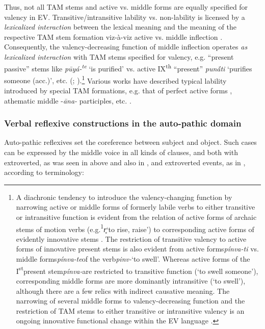 \documentclass[output=paper]{langscibook}
\begin{document}
{Thus, not all TAM stems and active vs. middle forms are equally specified for valency in EV. Transitive/intransitive lability vs. non-lability is licensed by a \textit{lexicalized interaction} between the lexical meaning and the meaning of the respective TAM stem formation viz-à-viz active vs. middle inflection \citep{Pooth2014}. Consequently, the valency-decreasing function of middle inflection operates \textit{as lexicalized interaction} with TAM stems specified for valency, e.g. “present passive” stems like \textit{pūyá-\textsuperscript{te}} ‘is purified’ vs. active IX\textsuperscript{th} “present” \textit{pun\'{ā}ti} ‘purifies someone (acc.)’, etc. (\citealt{Kulikov2012}; \citealt{Pooth2014}).}\footnote{{{A diachronic tendency to introduce the valency-changing function by narrowing active or middle forms of formerly labile verbs to either transitive or intransitive function is evident from the relation of active forms of archaic stems of motion verbs (e.g.}{\textsuperscript{1}}{\textit{r̥}}{‘to rise, raise’) to corresponding active forms of evidently innovative stems \citep{Pooth2012}. The restriction of transitive valency to active forms of innovative present stems is also evident from active forms}{\textit{pínva-ti} }{vs. middle forms}{\textit{pínva-te}}{of the verb}{\textit{pinv-}}{‘to swell’. Whereas active forms of the I}{\textsuperscript{st}}{present stem}{\textit{pínva-}}{are restricted to transitive function (‘to swell someone’), corresponding middle forms are more dominantly intransitive (‘to swell’), although there are a few relics with indirect causative meaning. The narrowing of several middle forms to valency-decreasing function and the restriction of TAM stems to either transitive or intransitive valency is an ongoing innovative functional change within the EV language \citep{Pooth2014}.}}}{ Various works have described typical lability introduced by special TAM formations, e.g. that of perfect active forms \citep{Kuemmel2000}, athematic middle -\textit{āna-} participles, etc. \citep{Kulikov2014}.}


\subsubsection{Verbal reflexive constructions in the auto-pathic domain}
\label{sec:Orqueda:2.1.2}

{Auto-pathic reflexives set the coreference between subject and object. Such cases can be expressed by the middle voice in all kinds of clauses, and both with extroverted, as was seen in  above and also in , and extroverted events, as in , according to  terminology:}
\end{document}
